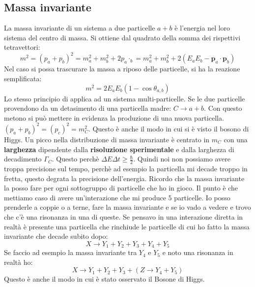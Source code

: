 \subsection{Massa invariante}
La massa invariante di un sistema a due particelle $a+b$ è l'energia nel loro sistema del centro di massa. Si ottiene dal quadrato della somma dei rispettivi tetravettori:
\begin{equation*}
    m^2=(p_a+p_b)^2=m_a^2+m_b^2+2p_a\cdotp_b=m_a^2+m_b^2+2(E_aE_b-\mathbf{p}_a\cdot \mathbf{p}_b)
\end{equation*}
Nel caso si possa trascurare la massa a riposo delle particelle, si ha la reazione semplificata:
\begin{equation*}
    m^2=2E_aE_b(1-\cos{\theta_{a,b}})
\end{equation*}
Lo stesso principio di applica ad un sistema multi-particelle. Se le due particelle provendono da un detasimento di una particella madre: $C\to a+b$. Con questo metono si può mettere in evidenza la produzione di una nuova particella. $(p_a+p_b)^2=(p_c)^2=m_C^2$. Questo è anche il modo in cui si è visto il bosono di Higgs. Un picco nella distribuzione di massa invariante è centrato in $m_C$ con una \textbf{larghezza} dipendente dalla \textbf{risoluzione sperimentale} e dalla larghezza di decadimento $\Gamma_C$. Questo perchè $\Delta E\Delta t\ge\frac{\hbar}{2}$. Quindi noi non possiamo avere troppa precisione sul tempo, perchè ad esempio la particella mi decade troppo in fretta, questo degrata la precisione dell'energia. Ricordo che la massa invariante la posso fare per ogni sottogruppo di particelle che ho in gioco. Il punto è che mettiamo caso di avere un'interazione che mi produce 5 particelle. Io posso prenderle a coppie o a terne, fare la massa invariante e se io vado a vedere e trovo che c'è una risonanza in una di queste. Se pensavo in una interazione diretta in realtà è presente una particella che rinchiude le particelle di cui ho fatto la massa invariante che decade subito dopo:
\begin{equation*}
    X\to Y_1+ Y_2+ Y_3+ Y_4+ Y_5
\end{equation*}
Se faccio ad esempio la massa invariante tra $Y_4$ e $Y_5$ e noto una risonanza in realtà ho:
\begin{equation*}
    X\to Y_1+ Y_2+ Y_3+ (Z\to Y_4+ Y_5 )
\end{equation*}
Questo è anche il modo in cui è stato osservato il Bosone di Higgs.
